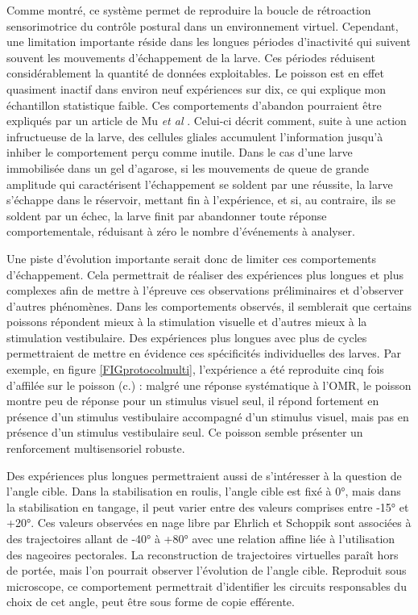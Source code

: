 Comme montré, ce système permet de reproduire la boucle de rétroaction sensorimotrice du contrôle postural dans un environnement virtuel. Cependant, une limitation importante réside dans les longues périodes d'inactivité qui suivent souvent les mouvements d'échappement de la larve. 
Ces périodes réduisent considérablement la quantité de données exploitables. Le poisson est en effet quasiment inactif dans environ neuf expériences sur dix, ce qui explique mon échantillon statistique faible.
Ces comportements d'abandon pourraient être expliqués par un article de Mu \emph{et al} \cite{mu_glia_2019}. Celui-ci décrit comment, suite à une action infructueuse de la larve, des cellules gliales accumulent l'information jusqu'à inhiber le comportement perçu comme inutile.
Dans le cas d'une larve immobilisée dans un gel d'agarose, si les mouvements de queue de grande amplitude qui caractérisent l'échappement se soldent par une réussite, la larve s'échappe dans le réservoir, mettant fin à l'expérience, et si, au contraire, ils se soldent par un échec, la larve finit par abandonner toute réponse comportementale, réduisant à zéro le nombre d'événements à analyser.

Une piste d'évolution importante serait donc de limiter ces comportements d'échappement. Cela permettrait de réaliser des expériences plus longues et plus complexes afin de mettre à l'épreuve ces observations préliminaires et d'observer d'autres phénomènes.
Dans les comportements observés, il semblerait que certains poissons répondent mieux à la stimulation visuelle et d'autres mieux à la stimulation vestibulaire. Des expériences plus longues avec plus de cycles permettraient de mettre en évidence ces spécificités individuelles des larves. Par exemple, en figure \ref{FIGprotocolmulti}, l'expérience a été reproduite cinq fois d'affilée sur le poisson (c.) : malgré une réponse systématique à l'OMR, le poisson montre peu de réponse pour un stimulus visuel seul, il répond fortement en présence d'un stimulus vestibulaire accompagné d'un stimulus visuel, mais pas en présence d'un stimulus vestibulaire seul. Ce poisson semble présenter un renforcement multisensoriel robuste.

Des expériences plus longues permettraient aussi de s'intéresser à la question de l'angle cible. Dans la stabilisation en roulis, l'angle cible est fixé à 0°, mais dans la stabilisation en tangage, il peut varier entre des valeurs comprises entre -15° et +20°. Ces valeurs observées en nage libre par Ehrlich et Schoppik \cite{ehrlich_primal_2019} sont associées à des trajectoires allant de -40° à +80° avec une relation affine liée à l'utilisation des nageoires pectorales. La reconstruction de trajectoires virtuelles paraît hors de portée, mais l'on pourrait observer l'évolution de l'angle cible. Reproduit sous microscope, ce comportement permettrait d'identifier les circuits responsables du choix de cet angle, peut être sous forme de copie efférente.

